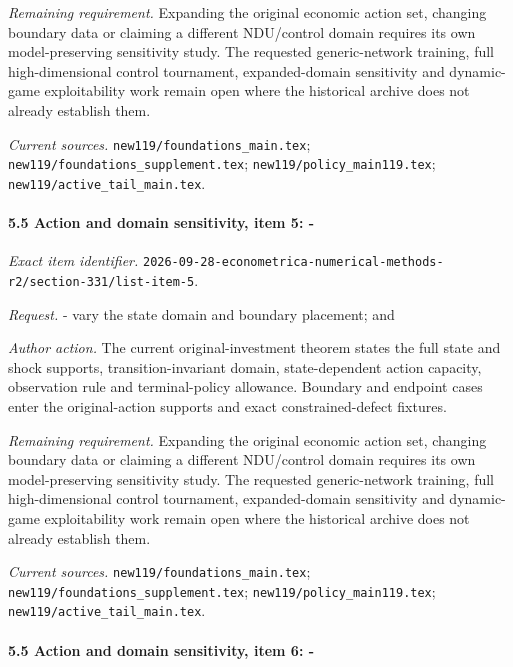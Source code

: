 \par\emph{Remaining requirement.} Expanding the original economic action set, changing boundary data or claiming a different NDU/\allowbreak{}control domain requires its own model-preserving sensitivity study. The requested generic-network training, full high-dimensional control tournament, expanded-domain sensitivity and dynamic-game exploitability work remain open where the historical archive does not already establish them.

\par\emph{Current sources.} \nolinkurl{new119/foundations_main.tex}; \nolinkurl{new119/foundations_supplement.tex}; \nolinkurl{new119/policy_main119.tex}; \nolinkurl{new119/active_tail_main.tex}.

\paragraph{5.5 Action and domain sensitivity, item 5: -}

\emph{Exact item identifier.} \nolinkurl{2026-09-28-econometrica-numerical-methods-r2/section-331/list-item-5}.

\par\emph{Request.} - vary the state domain and boundary placement; and

\par\emph{Author action.} The current original-investment theorem states the full state and shock supports, transition-invariant domain, state-dependent action capacity, observation rule and terminal-policy allowance. Boundary and endpoint cases enter the original-action supports and exact constrained-defect fixtures.

\par\emph{Remaining requirement.} Expanding the original economic action set, changing boundary data or claiming a different NDU/\allowbreak{}control domain requires its own model-preserving sensitivity study. The requested generic-network training, full high-dimensional control tournament, expanded-domain sensitivity and dynamic-game exploitability work remain open where the historical archive does not already establish them.

\par\emph{Current sources.} \nolinkurl{new119/foundations_main.tex}; \nolinkurl{new119/foundations_supplement.tex}; \nolinkurl{new119/policy_main119.tex}; \nolinkurl{new119/active_tail_main.tex}.

\paragraph{5.5 Action and domain sensitivity, item 6: -}


